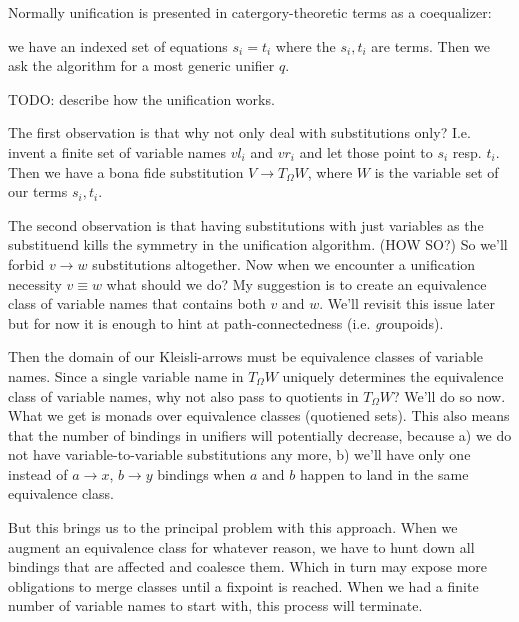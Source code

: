 \documentclass{article}
\begin{document}
Normally unification is presented in catergory-theoretic terms as a coequalizer:

we have an indexed set of equations $s_i = t_i$ where the ${s_i, t_i}$ are terms.
Then we ask the algorithm for a most generic unifier $q$.

TODO: describe how the unification works.

The first observation is that why not only deal with substitutions only? I.e. invent a finite set of variable names $vl_i$ and $vr_i$ and let those point to $s_i$ resp. $t_i$. Then we have a bona fide substitution $V \to T_{\Omega}W$, where $W$ is the variable set of our terms ${s_i, t_i}$.

The second observation is that having substitutions with just variables as the substituend kills the symmetry in the unification algorithm. (HOW SO?) So we'll forbid $v \to w$ substitutions altogether. Now when we encounter a unification necessity $v \equiv w$ what should we do?
My suggestion is to create an equivalence class of variable names that contains both $v$ and $w$. We'll revisit this issue later but for now it is enough to hint at path-connectedness (i.e. \emph groupoids).

Then the domain of our Kleisli-arrows must be equivalence classes of variable names. Since a single variable name in $T_{\Omega}W$ uniquely determines the equivalence class of variable names, why not also pass to quotients in $T_{\Omega}W$?
We'll do so now. What we get is monads over equivalence classes (quotiened sets). This also means that the number of bindings in unifiers will potentially decrease, because \itemize
a) we do not have variable-to-variable substitutions any more,
b) we'll have only one instead of $a \to x$, $b \to y$ bindings when $a$ and $b$ happen to land in the same equivalence class.

But this brings us to the principal problem with this approach. When we augment an equivalence class for whatever reason, we have to hunt down all bindings that are affected and coalesce them. Which in turn may expose more obligations to merge classes until a fixpoint is reached. When we had a finite number of variable names to start with, this process will terminate.
\end{document}
